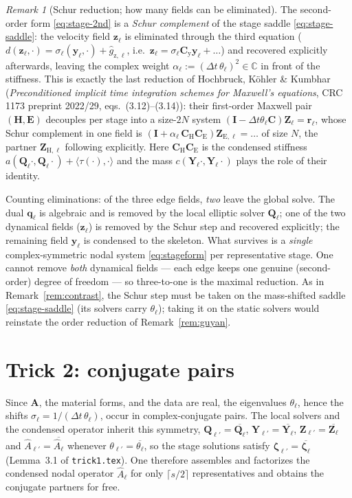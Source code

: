 \documentclass[11pt]{article}
\theoremstyle{remark}
\newtheorem*{remark}{Remark}
\renewcommand{\vec}{\boldsymbol}
\newcommand{\bvec}[1]{\vec{#1}}
\newcommand{\C}{\mathbb{C}}
\newcommand{\mA}{\mathbf{A}}
\newcommand{\mC}{\mathbf{C}}
\newcommand{\mI}{\mathbf{I}}
\newcommand{\Cy}{\mathbf{C}_{\mathrm y}} %
\newcommand{\dt}{\Delta t}
\begin{document}
\begin{remark}[Schur reduction; how many fields can be eliminated]\label{rem:schur}
The second-order form \eqref{eq:stage-2nd} is a \emph{Schur complement} of the
stage saddle \eqref{eq:stage-saddle}: the velocity field $\bvec z_\ell$ is
eliminated through the third equation
($d(\bvec z_\ell,\cdot)=\sigma_\ell(\bvec y_\ell,\cdot)+\widehat g_{\mathrm z,\ell}$,
i.e.\ $\bvec z_\ell=\sigma_\ell\Cy\bvec y_\ell+\dots$) and recovered explicitly
afterwards, leaving the complex weight $\alpha_\ell:=(\dt\,\theta_\ell)^2\in\C$ in
front of the stiffness. This is exactly the last reduction of Hochbruck,
K\"ohler \& Kumbhar (\emph{Preconditioned implicit time integration schemes for
Maxwell's equations}, CRC\,1173 preprint 2022/29, eqs.~(3.12)--(3.14)): their
first-order Maxwell pair $(\bvec H,\bvec E)$ decouples per stage into a size-$2N$
system $(\mI-\dt\theta_\ell\mC)\bvec Z_\ell=\bvec r_\ell$, whose Schur complement in
one field is $(\mI+\alpha_\ell\,\mC_{\mathrm H}\mC_{\mathrm E})\bvec Z_{\mathrm
E,\ell}=\dots$ of size $N$, the partner $\bvec Z_{\mathrm H,\ell}$ following
explicitly. Here $\mC_{\mathrm H}\mC_{\mathrm E}$ is the condensed stiffness
$a(\bvec Q_\ell\cdot,\bvec Q_\ell\cdot)+\langle\tau(\cdot),\cdot\rangle$ and the
mass $c(\bvec Y_\ell\cdot,\bvec Y_\ell\cdot)$ plays the role of their identity.

Counting eliminations: of the three edge fields, \emph{two} leave the global solve.
The dual $\bvec q_\ell$ is algebraic and is removed by the local elliptic solver
$\bvec Q_\ell$; one of the two dynamical fields ($\bvec z_\ell$) is removed by the
Schur step and recovered explicitly; the remaining field $\bvec y_\ell$ is condensed
to the skeleton. What survives is a \emph{single} complex-symmetric nodal system
\eqref{eq:stageform} per representative stage. One cannot remove \emph{both}
dynamical fields --- each edge keeps one genuine (second-order) degree of freedom
--- so three-to-one is the maximal reduction. As in Remark~\ref{rem:contrast}, the
Schur step must be taken on the mass-shifted saddle \eqref{eq:stage-saddle} (its
solvers carry $\theta_\ell$); taking it on the static solvers would reinstate the
order reduction of Remark~\ref{rem:guyan}.
\end{remark}

\section{Trick 2: conjugate pairs}

Since $\mA$, the material forms, and the data are real, the eigenvalues
$\theta_\ell$, hence the shifts $\sigma_\ell=1/(\dt\,\theta_\ell)$, occur in
complex-conjugate pairs. The local solvers and the condensed operator inherit this
symmetry, $\bvec Q_{\ell'}=\overline{\bvec Q_\ell}$, $\bvec
Y_{\ell'}=\overline{\bvec Y_\ell}$, $\bvec Z_{\ell'}=\overline{\bvec Z_\ell}$ and
$\widehat A_{\ell'}=\overline{\widehat A_\ell}$ whenever
$\theta_{\ell'}=\overline{\theta_\ell}$, so the stage solutions satisfy
$\vec\zeta_{\ell'}=\overline{\vec\zeta_\ell}$ (Lemma~3.1 of \texttt{trick1.tex}).
One therefore assembles and factorizes the condensed nodal operator $\widehat
A_\ell$ for only $\lceil s/2\rceil$ representatives and obtains the conjugate
partners for free.
\end{document}
